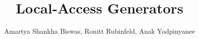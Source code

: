 \documentclass[final]{beamer}
\title{Local-Access Generators} %
\author{Amartya Shankha Biswas, Ronitt Rubinfeld, Anak Yodpinyanee} %
\institute{CSAIL, MIT} %
\newlength{\sepwid}
\newlength{\leftcolwid}
\newlength{\rightcolwid}
\newlength{\twocolwid}
\begin{document}

\setlength{\belowcaptionskip}{2ex} %
\setlength\belowdisplayshortskip{2ex} %

\begin{frame}[t] %


\begin{columns}[t] %

\begin{column}{\sepwid}\end{column} %

\begin{column}{\leftcolwid} %




\end{column} %


\begin{column}{\sepwid}\end{column} %


\begin{column}{\twocolwid} %






\end{column} %



\begin{column}{\sepwid}\end{column} %



\begin{column}{\rightcolwid} %


\end{column}
\end{columns}
\end{frame}
\end{document}
